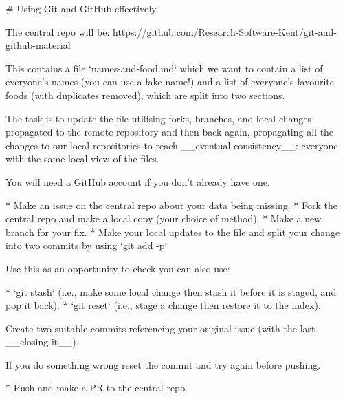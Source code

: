 # Using Git and GitHub effectively

The central repo will be: https://github.com/Research-Software-Kent/git-and-github-material

This contains a file `names-and-food.md` which we want to contain a list of everyone's names (you can use a fake name!) and a list of everyone's favourite foods (with duplicates removed), which are split into two sections.

The task is to update the file utilising forks, branches, and local changes propagated to the remote repository and then back again, propagating all the changes to our local repositories to reach __eventual consistency__: everyone with the same local view of the files.

You will need a GitHub account if you don't already have one.

* Make an issue on the central repo about your data being missing.
* Fork the central repo and make a local copy (your choice of method).
* Make a new branch for your fix.
* Make your local updates to the file and split your change into two commits by using `git add -p`

Use this as an opportunity to check you can also use:

* `git stash` (i.e., make some local change then stash it
before it is staged, and pop it back).
* `git reset` (i.e., stage a change then restore it to the index).

Create two suitable commits referencing your original issue (with
the last __closing it__).

If you do something wrong reset the commit and try again before pushing.

* Push and make a PR to the central repo.
